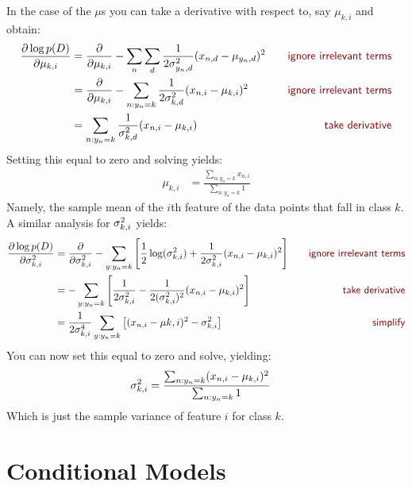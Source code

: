 In the case of the $\mu$s you can take a derivative with respect to,
say $\mu_{k,i}$ and obtain:
%
\begin{align}
   \frac {\partial \log p(D)} {\partial \mu_{k,i}}
&= \frac {\partial} {\partial \mu_{k,i}}
     - \sum_n \sum_d \frac 1 {2 \si_{y_n,d}^2} (x_{n,d} - \mu_{y_n,d})^2
   \becauseof{ignore irrelevant terms} \\
&= \frac {\partial} {\partial \mu_{k,i}}
     - \sum_{n:y_n=k} \frac 1 {2 \si_{k,d}^2} (x_{n,i} - \mu_{k,i})^2
   \becauseof{ignore irrelevant terms} \\
&= \sum_{n:y_n=k} \frac 1 {\si_{k,d}^2} (x_{n,i} - \mu_{k,i})
   \becauseof{take derivative}
\end{align}
%
Setting this equal to zero and solving yields:
%
\begin{align}
  \mu_{k,i} &= \frac {\sum_{n:y_n=k} x_{n,i}} {\sum_{n:y_n=k} 1}
\end{align}
%
Namely, the sample mean of the $i$th feature of the data points that
fall in class $k$.  A similar analysis for $\sigma_{k,i}^2$ yields:
%
\begin{align}
   \frac {\partial \log p(D)} {\partial \si^2_{k,i}}
&= \frac {\partial} {\partial \si^2_{k,i}}
     - \sum_{y:y_n=k} \left[ \frac 1 2 \log(\si_{k,i}^2) + 
                            \frac 1 {2 \si_{k,i}^2} (x_{n,i} - \mu_{k,i})^2\right]
   \becauseof{ignore irrelevant terms} \\
&= - \sum_{y:y_n=k} \left[
       \frac 1 {2 \si_{k,i}^2}
     - \frac 1 {2 (\si_{k,i}^2)^2} (x_{n,i} - \mu_{k,i})^2 \right]
   \becauseof{take derivative} \\
&= \frac 1 {2 \si_{k,i}^4} \sum_{y:y_n=k} \left[ (x_{n,i} - \mu{k,i})^2 - \si_{k,i}^2 \right]
   \becauseof{simplify}
\end{align}
%
You can now set this equal to zero and solve, yielding:
%
\begin{align}
  \sigma_{k,i}^2 &=
    \frac {\sum_{n:y_n=k} (x_{n,i}-\mu_{k,i})^2} {\sum_{n:y_n=k} 1}
\end{align}
%
Which is just the sample variance of feature $i$ for class $k$.


\section{Conditional Models}

